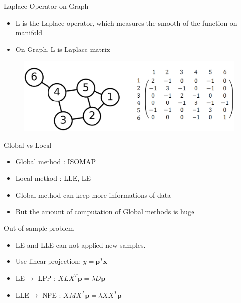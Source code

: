 \documentclass{beamer}
\newcommand{\bol}[1]{\textbf{#1}}
\begin{document}
\begin{darkframes}
    \begin{frame}{Laplace Operator on Graph}
    \begin{itemize}
    	\item L is the Laplace operator, which measures the smooth of the function on manifold
    	\item On Graph, L is Laplace matrix
    \end{itemize}
    \begin{figure}
    \centering
    \includegraphics[scale=0.2]{./figs/fig9.eps}
    \end{figure}
    \end{frame}
    
    
    
	\begin{frame}{Global vs Local}
	\begin{itemize}
		\item Global method : ISOMAP\\
		\item Local method : LLE, LE\\
		\item Global method can keep more informations of data\\
		\item But the amount of computation of Global methods is huge
	\end{itemize}
	\end{frame}	    
    
    \begin{frame}{Out of sample problem}
    \begin{itemize}
    	\item LE and LLE can not applied new samples. 
    	\item Use linear projection: $y = \bol{p}^T\bol{x}$
    	\item LE$\rightarrow$ LPP : $XLX^T\bol{p} = \lambda D\bol{p}$
    	\item LLE$\rightarrow$ NPE : $XMX^T\bol{p} = \lambda XX^T\bol{p}$
    \end{itemize}
    

\end{frame}
\end{darkframes}
\end{document}
